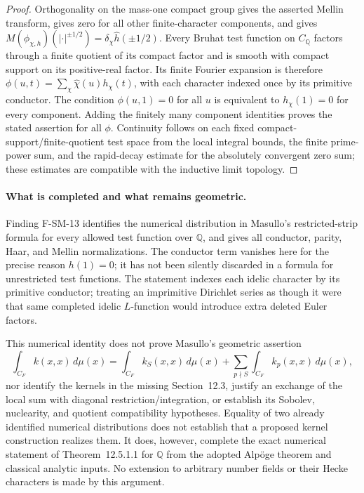 \documentclass[11pt,a4paper]{article}
\theoremstyle{definition}\newtheorem{definition}[theorem]{Definition}
\theoremstyle{remark}\newtheorem{remark}[theorem]{Remark}
\begin{document}
\begin{proof}
Orthogonality on the mass-one compact group gives the asserted Mellin
transform, gives zero for all other finite-character components, and gives
$M(\phi_{\chi,h})(|\cdot|^{\pm1/2})=
\delta_\chi\widehat h(\pm1/2)$.  Every Bruhat test function on
$C_{\mathbb Q}$ factors through a finite quotient of its compact factor
and is smooth with compact support on its positive-real factor.  Its
finite Fourier expansion is therefore
$\phi(u,t)=\sum_\chi\widehat\chi(u)h_\chi(t)$, with each character
indexed once by its primitive conductor.  The condition
$\phi(u,1)=0$ for all $u$ is equivalent to $h_\chi(1)=0$ for every
component.  Adding the finitely many component identities proves the
stated assertion for all $\phi$.  Continuity follows on each fixed
compact-support/finite-quotient test space from the local integral bounds,
the finite prime-power sum, and the rapid-decay estimate for the absolutely
convergent zero sum; these estimates are compatible with the inductive
limit topology.
\end{proof}

\paragraph{What is completed and what remains geometric.}
Finding F-SM-13 identifies the numerical distribution in Masullo's
restricted-strip formula for every allowed test function over
$\mathbb Q$, and gives all conductor, parity, Haar, and Mellin
normalizations.  The conductor term vanishes here for the precise reason
$h(1)=0$; it has not been silently discarded in a formula for unrestricted
test functions.  The statement indexes each idelic character by its
primitive conductor; treating an imprimitive Dirichlet series as though it
were that same completed idelic $L$-function would introduce extra deleted
Euler factors.

This numerical identity does not prove Masullo's geometric assertion
\[
 \int_{C_F}k(x,x)\,d\mu(x)
 =\int_{C_F}k_S(x,x)\,d\mu(x)
   +\sum_{p\nmid S}\int_{C_F}k_p(x,x)\,d\mu(x),
\]
nor identify the kernels in the missing Section~12.3, justify an exchange
of the local sum with diagonal restriction/integration, or establish its
Sobolev, nuclearity, and quotient compatibility hypotheses.  Equality of
two already identified numerical distributions does not establish that
a proposed kernel construction realizes them.  It does, however, complete
the exact numerical statement of Theorem~12.5.1.1 for $\mathbb Q$ from
the adopted Alp\"oge theorem and classical analytic inputs.  No extension
to arbitrary number fields or their Hecke characters is made by this
argument.
\end{document}
